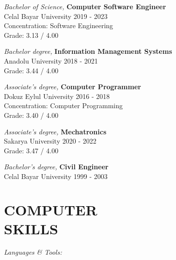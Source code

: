 \documentclass[line,margin]{res}
\begin{document}
\begin{resume}
                {\sl Bachelor of Science,} \textbf{Computer Software Engineer} \\
                Celal Bayar University 
                2019 - 2023 \\
                Concentration: Software Engineering \\
                Grade: 3.13 / 4.00 
                
                {\sl Bachelor degree,} \textbf{Information Management Systems} \\
                Anadolu University 
                2018 - 2021 \\
                Grade: 3.44 / 4.00 

                {\sl Associate's degree,} \textbf{Computer Programmer} \\
                Dokuz Eylul University 
                2016 - 2018 \\
                Concentration: Computer Programming \\
                Grade: 3.40 / 4.00 
 
                {\sl Associate's degree,} \textbf{Mechatronics} \\
                Sakarya University 
                2020 - 2022 \\
                Grade: 3.47 / 4.00 

                {\sl Bachelor's degree,} \textbf{Civil Engineer} \\
                Celal Bayar University 
                1999 - 2003 \\
\section{COMPUTER \\ SKILLS} {\sl Languages \& Tools:} \\

\end{resume}
\end{document}
